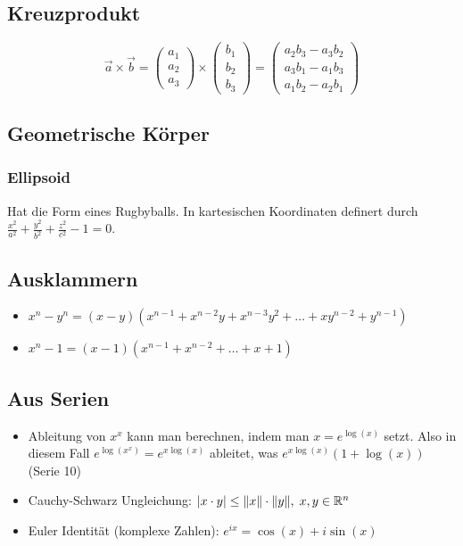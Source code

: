 \subsection{Kreuzprodukt}
{\footnotesize
\[
\vec{a} \times \vec{b} = \left ( \begin{array}{c} a_1 \\ a_2 \\ a_3 \end{array}
\right ) \times
\left ( \begin{array}{c} b_1 \\ b_2 \\ b_3 \end{array}
\right ) =
\left ( \begin{array}{c} a_2b_3 - a_3b_2 \\ a_3b_1 - a_1b_3 \\ a_1b_2 - a_2b_1
\end{array} \right )
\]
}

\subsection{Geometrische Körper}
\subsubsection{Ellipsoid}
Hat die Form eines Rugbyballs. In kartesischen Koordinaten definert durch
$\frac{x^2}{a^2} + \frac{y^2}{b^2} + \frac{z^2}{c^2} - 1 = 0$.

\subsection{Ausklammern}
\begin{itemize}[leftmargin=*]
	\item $x^n - y^n = (x-y) (x^{n-1} + x^{n-2}y + x^{n-3}y^2 + \ldots + xy^{n-2}
	+ y^{n-1})$
	\item $x^n - 1 = (x-1)(x^{n-1} + x^{n-2} + \ldots + x + 1)$
\end{itemize}

\subsection{Aus Serien}
\begin{itemize}[leftmargin=*]
	\item Ableitung von $x^x$ kann man berechnen, indem man $x = e^{\log(x)}$
	setzt. Also in diesem Fall $e^{\log(x^x)} = e^{x \log(x)}$ ableitet, was $e^{x
	\log(x)} (1 + \log(x))$ (Serie 10)
	\item Cauchy-Schwarz Ungleichung: $|x \cdot y| \leq \|x\| \cdot \|y\|, \; x,y \in \mathbb{R}^n$
	\item Euler Identität (komplexe Zahlen): $e^{ix} = \cos(x) + i \sin(x)$
\end{itemize}

